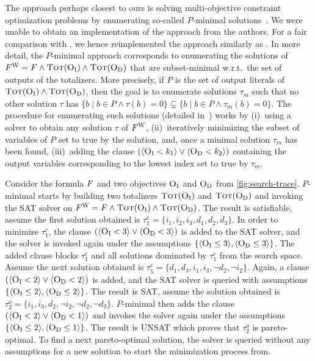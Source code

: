 The approach perhaps closest to ours is solving multi-objective constraint optimization problems by enumerating so-called $P$-minimal solutions~\autocite{DBLP:conf/cp/SohBTB17,DBLP:conf/ftp/KoshimuraNFH09}.
We were unable to obtain an implementation of the approach from the authors.
For a fair comparison with \algname{}, we hence reimplemented the approach similarly as \algname{}.
In more detail, the $P$-minimal approach  corresponds to enumerating the solutions of $F^\text{W} = F \land \textsc{Tot}(\textsc{O}_{\text{I}}) \land \textsc{Tot}(\textsc{O}_{\text{D}})$ that are subset-minimal w.r.t.\ the set of outputs of the totalizers.
More precisely, if $P$ is the set of output literals of $\textsc{Tot}(\textsc{O}_{\text{I}}) \land \textsc{Tot}(\textsc{O}_{\text{D}})$, then the goal is to enumerate solutions $\tau_m$ such that no other solution $\tau$ has $\{ b \mid b \in P \land \tau(b) = 0\} \subsetneq \{ b \mid b \in P \land \tau_m(b) = 0\}$.
The procedure for enumerating such solutions (detailed in~\textcite{DBLP:conf/ftp/KoshimuraNFH09}) works by (i)~using a solver to obtain any solution $\tau$ of $F^\text{W}$, (ii)~iteratively minimizing the subset of variables of $P$ set to true by the solution, and, once a minimal solution $\tau_m$ has been found, (iii)~adding the clause $(\langle \textsc{O}_{\text{I}} < k_1 \rangle \lor \langle \textsc{O}_{\text{D}} < k_2 \rangle)$ containing the output variables corresponding to the lowest index set to true by $\tau_m$.

\begin{example}
  Consider the formula $F$ and two objectives $\textsc{O}_{\text{I}}$ and $\textsc{O}_{\text{D}}$ from \cref{fig:search-trace}.
  $P$-minimal starts by building two totalizers $\textsc{Tot}(\textsc{O}_{\text{I}})$ and $\textsc{Tot}(\textsc{O}_{\text{D}})$ and invoking the SAT solver on $F^\text{W} = F \land \textsc{Tot}(\textsc{O}_{\text{I}}) \land \textsc{Tot}(\textsc{O}_{\text{D}})$.
  The result is satisfiable, assume the first solution obtained is $\tau^c_1 = \{i_1, i_2, i_3, d_1, d_2, d_3\}$. 
  In order to minimize $\tau^c_1$, the clause $(\langle \textsc{O}_{\text{I}} < 3 \rangle \lor \langle \textsc{O}_{\text{D}} < 3 \rangle)$ is added to the SAT solver, and the solver is invoked again under the assumptions $\{ \langle \textsc{O}_{\text{I}} \leq 3 \rangle, \langle \textsc{O}_{\text{D}} \leq 3 \rangle \}$.
  The added clause blocks $\tau^c_1$ and all solutions dominated by $\tau^c_1$ from the search space.
  Assume the next solution obtained is $\tau^c_5 = \{d_1, d_3, i_1, i_3, \lnot d_2, \lnot i_2\}$. 
  Again, a clause $(\langle \textsc{O}_{\text{I}} < 2 \rangle \lor \langle \textsc{O}_{\text{D}} < 2 \rangle)$ is added, and the SAT solver is queried with assumptions $\{ \langle \textsc{O}_{\text{I}} \leq 2 \rangle, \langle \textsc{O}_{\text{D}} \leq 2 \rangle \}$.
  The result is SAT, assume the solution obtained is $\tau^o_2 = \{ i_1, i_3, d_2, \lnot i_2, \lnot d_2, \lnot d_3\}$. 
  $P$-minimal then adds the clause $(\langle \textsc{O}_{\text{I}} < 2 \rangle \lor \langle \textsc{O}_{\text{D}} < 1 \rangle)$ and invokes the solver again under the assumptions $\{ \langle \textsc{O}_{\text{I}} \leq 2 \rangle, \langle \textsc{O}_{\text{D}} \leq 1 \rangle \}$.
  The result is UNSAT which proves that $\tau^o_2$ is pareto-optimal. 
  To find a next pareto-optimal solution, the solver is queried without any assumptions for a new solution to start the minimization process from.
\end{example}

